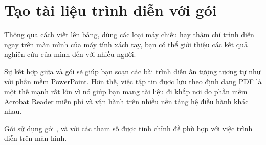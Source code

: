 %
%

\section{Tạo tài liệu trình diễn với gói }
\label{sec:beamer}
Thông qua cách viết lên bảng, dùng các loại máy chiếu hay thậm chí trình diễn ngay trên màn mình của máy tính xách tay,  bạn có thể giới thiệu các kết quả nghiên cứu của mình đến với nhiều người.

Sự kết hợp giữa  và gói  sẽ giúp bạn soạn các bài trình diễn ấn tượng tương tự như với phần mềm PowerPoint. Hơn thế, việc tập tin được lưu theo định dạng PDF là một thế mạnh rất lớn vì nó giúp bạn mang tài liệu đi khắp nơi do phần mềm Acrobat Reader miễn phí và vận hành trên nhiều nền tảng hệ điều hành khác nhau.

Gói  sử dụng gói ,  và  với các tham số được tinh chỉnh đề phù hợp với việc trình diễn trên màn hình.


